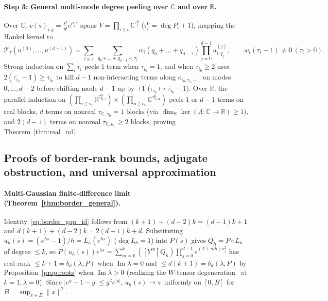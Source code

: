 \documentclass[11pt,a4paper]{article}
\theoremstyle{plain}
\theoremstyle{definition}
\newcommand{\R}{\mathbb{R}}
\newcommand{\C}{\mathbb{C}}
\DeclareMathOperator{\ImPart}{Im}
\begin{document}
\paragraph{Step 3: General multi-mode degree peeling over $\C$ and over $\R$.}
Over $\C$, $v(s)_{i,q} = \frac{s^q}{q!}e^{\mu_i s}$ spans $V = \prod_{i \in \iota} \C^{\tau_i^0}$ ($\tau_i^0 = \deg P_i + 1$), mapping the Hankel kernel to
\[
  \mathcal{T}_\tau(u^{(0)}, \dots, u^{(d-1)})
  = \sum_{i \in \iota}\; \sum_{q_0 + \dots + q_{d-1} < \tau_i} w_i(q_0 + \dots + q_{d-1}) \prod_{j=0}^{d-1} u^{(j)}_{i, q_j}, \qquad w_i(\tau_i - 1) \ne 0\ (\tau_i > 0).
\]
Strong induction on $\sum_i \tau_i$ peels $1$ term when $\tau_{i_0} = 1$, and when $\tau_{i_0} \ge 2$ uses $2(\tau_{i_0} - 1) \ge \tau_{i_0}$ to kill $d - 1$ non-interacting terms along $e_{i_0, \tau_{i_0}-1}$ on modes $0,\dots,d - 2$ before shifting mode $d - 1$ up by $+1$ ($\tau_{i_0} \mapsto \tau_{i_0} - 1$). Over $\R$, the parallel induction on $(\prod_{i \in \iota_{\R}} \R^{\tau_{\R,i}^0}) \times (\prod_{u \in \iota_{\C}} \C^{\tau_{\C,u}^0})$ peels $1$ or $d - 1$ terms on real blocks, $d$ terms on nonreal $\tau_{\C,u_0} = 1$ blocks (via $\dim_{\R}\ker(\Lambda : \C \to \R) \ge 1$), and $2(d - 1)$ terms on nonreal $\tau_{\C,u_0} \ge 2$ blocks, proving Theorem~\ref{thm:real_nd}.

\subsection{Proofs of border-rank bounds, adjugate obstruction, and universal approximation}\label{sec:border_proof}

\paragraph{Multi-Gaussian finite-difference limit (Theorem~\ref{thm:border_general}).}
Identity~\eqref{eq:border_gap_id} follows from $(k + 1) + (d - 2)k = (d - 1)k + 1$ and $d(k + 1) + (d - 2)k = 2(d - 1)k + d$. Substituting $u_h(s) = (e^{hs} - 1)/h = L_h(e^{hs})$ ($\deg L_h = 1$) into $P(s)$ gives $Q_h = P \circ L_h$ of degree $\le k$, so $P(u_h(s))e^{\lambda s} = \sum_{m=0}^k ([Y^m]Q_h)\prod_{j=0}^{d-1} e^{(\lambda + mh)x_j^2}$ has real rank $\le k + 1 = b_d(\lambda, P)$ when $\ImPart\lambda = 0$ and $\le d(k + 1) = b_d(\lambda, P)$ by Proposition~\ref{prop:roots} when $\ImPart\lambda > 0$ (realizing the $W$-tensor degeneration~\cite{bini1979complexity,buczynski2013ranks,zuiddam2017note} at $k = 1, \lambda = 0$). Since $|e^y - 1 - y| \le y^2 e^{|y|}$, $u_h(s) \to s$ uniformly on $[0, B]$ for $B = \sup_{x \in E}\|x\|^2$.
\end{document}
